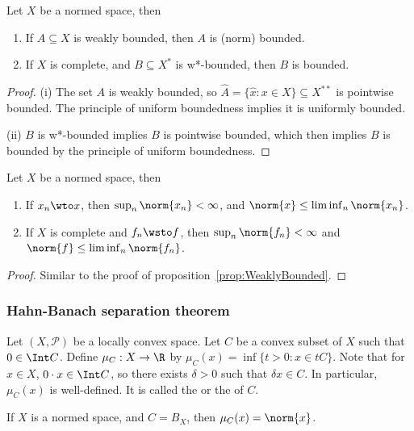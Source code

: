 \documentclass[a4paper]{article}
\begin{document}
\begin{nprop}\label{prop:WeaklyBounded}
	Let $X$ be a normed space, then
	\begin{enumerate}[label=(\roman*)]
		\item If $A\subseteq X$ is weakly bounded, then $A$ is (norm) bounded.
		\item If $X$ is complete, and $B\subseteq X^*$ is w*-bounded, then $B$ is bounded.
	\end{enumerate}
\end{nprop}

\begin{proof}
	(i) The set $A$ is weakly bounded, so $\widehat{A}=\{\hat{x}:x\in X\}\subseteq X^{**}$ is pointwise bounded. The principle of uniform boundedness implies it is uniformly bounded.

	(ii) $B$ is w*-bounded implies $B$ is pointwise bounded, which then implies $B$ is bounded by the principle of uniform boundedness.
\end{proof}

\begin{nprop}\label{prop:WeakConvergence}
	Let $X$ be a normed space, then
	\begin{enumerate}[label=(\roman*)]
		\item If $x_n\wto x$, then $\sup_n\norm{x_n}<\infty$, and $\norm{x}\leq\liminf_n\norm{x_n}$.
		\item If $X$ is complete and $f_n\wsto f$, then $\sup_n\norm{f_n}<\infty$ and $\norm{f}\leq\liminf_n\norm{f_n}$.
	\end{enumerate}
\end{nprop}

\begin{proof}
  Similar to the proof of proposition~\ref{prop:WeaklyBounded}.
\end{proof}

\subsubsection*{Hahn-Banach separation theorem}
Let $(X,\mathcal{P})$ be a locally convex space. Let $C$ be a convex subset of $X$ such that $0\in\Int C$. Define $\mu_C:X\to\R$ by $\mu_C(x)=\inf\{t>0:x\in tC\}$. Note that for $x\in X$, $0\cdot x\in\Int C$, so there exists $\delta>0$ such that $\delta x\in C$. In particular, $\mu_C(x)$ is well-defined. It is called the  or the  of $C$.

\begin{eg}
  If $X$ is a normed space, and $C=B_X$, then $\mu_C(x)=\norm{x}$.
\end{eg}
\end{document}
